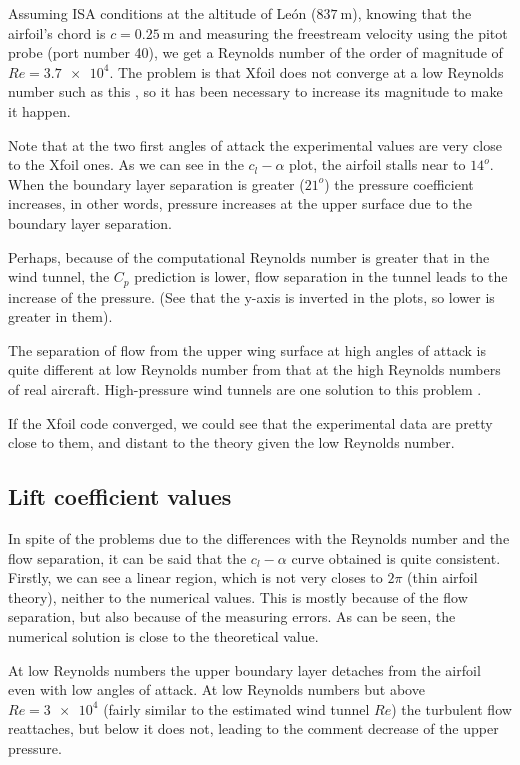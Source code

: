 \documentclass[10pt]{SelfArx} %
\begin{document}
Assuming ISA conditions at the altitude of León ($\SI{837}{\meter}$), knowing that the airfoil's chord is $c = \SI{0.25}{\meter}$ and measuring the freestream velocity using the pitot probe (port number 40), we get a Reynolds number of the order of magnitude of $Re = \num{3.7e4}$. The problem is that Xfoil does not converge at a low Reynolds number such as this \cite{Drela:low-reynolds}, so it has been necessary to increase its magnitude to make it happen. 

Note that at the two first angles of attack the experimental values are very close to the Xfoil ones. As we can see in the $c_l - \alpha$ plot, the airfoil stalls near to $14^{o}$. When the boundary layer separation is greater ($21^{o}$) the pressure coefficient increases, in other words, pressure increases at the upper surface due to the boundary layer separation.

Perhaps, because of the computational Reynolds number is greater that in the wind tunnel, the $C_p$ prediction is lower, flow separation in the tunnel leads to the increase of the pressure. (See that the y-axis is inverted in the plots, so lower is greater in them). 

The separation of flow from the upper wing surface at high angles of attack is quite different at low Reynolds number from that at the high Reynolds numbers of real aircraft. High-pressure wind tunnels are one solution to this problem \cite{Anderson:book-history}.

If the Xfoil code converged, we could see that the experimental data are pretty close to them, and distant to the theory given the low Reynolds number.

\subsection{Lift coefficient values}

In spite of the problems due to the differences with the Reynolds number and the flow separation, it can be said that the $c_l - \alpha$ curve obtained is quite consistent.
Firstly, we can see a linear region, which is not very closes to $2\pi$ (thin airfoil theory), neither to the numerical values. This is mostly because of the flow separation, but also because of the measuring errors. As can be seen, the numerical solution is close to the theoretical value.

At low Reynolds numbers the upper boundary layer detaches from the airfoil even with low angles of attack. At low Reynolds numbers but above $Re = \num{3e4}$ \cite{Gerakopulos:naca-low} (fairly similar to the estimated wind tunnel $Re$) the turbulent flow reattaches, but below it does not, leading to the comment decrease of the upper pressure.
\end{document}

